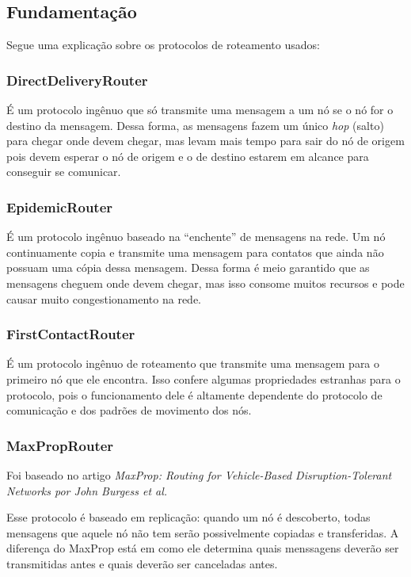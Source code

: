 \documentclass[conference]{IEEEtran}
\begin{document}
\subsection{Fundamentação}
Segue uma explicação sobre os protocolos de roteamento usados:

\subsubsection{DirectDeliveryRouter}
É um protocolo ingênuo que só transmite uma mensagem a um nó se o nó for o destino da mensagem. Dessa forma, as mensagens fazem um único \textit{hop} (salto) para chegar onde devem chegar, mas levam mais tempo para sair do nó de origem pois devem esperar o nó de origem e o de destino estarem em alcance para conseguir se comunicar.

\subsubsection{EpidemicRouter}
É um protocolo ingênuo baseado na \textquotedblleft enchente\textquotedblright{} de mensagens na rede. Um nó continuamente copia e transmite uma mensagem para contatos que ainda não possuam uma cópia dessa mensagem.
Dessa forma é meio garantido que as mensagens cheguem onde devem chegar, mas isso consome muitos recursos e pode causar
muito congestionamento na rede.

\subsubsection{FirstContactRouter}
É um protocolo ingênuo de roteamento que transmite uma mensagem para o primeiro nó que ele encontra. Isso confere algumas propriedades estranhas para o protocolo, pois o funcionamento dele é altamente dependente do protocolo de  comunicação e dos padrões de movimento dos nós.

\subsubsection{MaxPropRouter}
Foi baseado no artigo \textit{MaxProp: Routing for Vehicle-Based Disruption-Tolerant Networks por
John Burgess et al.}
 
Esse protocolo é baseado em replicação: quando um nó é descoberto, todas mensagens que aquele nó não
tem serão possivelmente copiadas e transferidas. A diferença do MaxProp está em como ele determina quais
menssagens deverão ser transmitidas antes e quais deverão ser canceladas antes.
\end{document}
